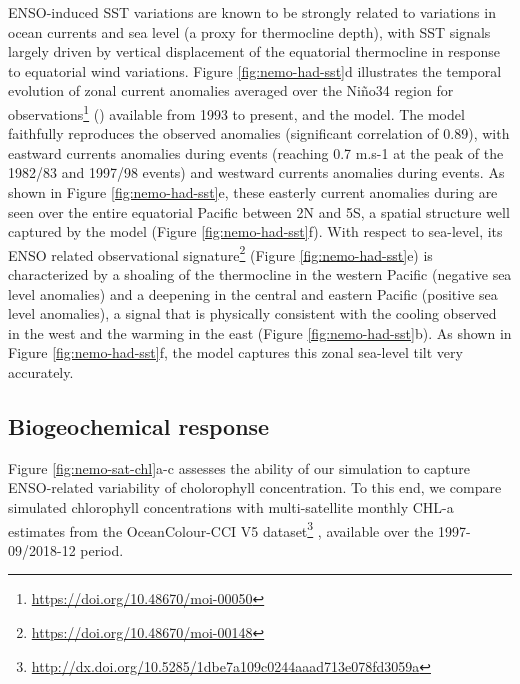 ENSO-induced SST variations are known to be strongly related to variations in ocean currents and sea level (a proxy for thermocline depth), with SST signals largely driven by vertical displacement of the equatorial thermocline in response to equatorial wind variations. Figure \ref{fig:nemo-had-sst}d illustrates the temporal evolution of zonal current anomalies averaged over the Niño34 region for observations\footnote{\url{https://doi.org/10.48670/moi-00050}} (\citealp{rioGOCEOceanCirculation2014}) available from 1993 to present, and the model. The model faithfully reproduces the observed anomalies (significant correlation of 0.89), with eastward currents anomalies during \nino{} events (reaching 0.7 m.s-1 at the peak of the 1982/83 and 1997/98 events) and westward currents anomalies during \nina{} events. As shown in Figure \ref{fig:nemo-had-sst}e, these easterly current anomalies during \nino{} are seen over the entire equatorial Pacific between 2N and 5S, a spatial structure well captured by the model (Figure \ref{fig:nemo-had-sst}f). With respect to sea-level, its ENSO related observational signature\footnote{\url{https://doi.org/10.48670/moi-00148}} (Figure \ref{fig:nemo-had-sst}e) is characterized by a shoaling of the thermocline in the western Pacific (negative sea level anomalies) and a deepening in the central and eastern Pacific (positive sea level anomalies), a signal that is physically consistent with the cooling observed in the west and the warming in the east (Figure \ref{fig:nemo-had-sst}b). As shown in Figure \ref{fig:nemo-had-sst}f, the model captures this zonal sea-level tilt very accurately.

\subsection{Biogeochemical response}

Figure \ref{fig:nemo-sat-chl}a-c assesses the ability of our simulation to capture ENSO-related variability of cholorophyll concentration. To this end, we compare simulated chlorophyll concentrations with multi-satellite monthly CHL-a estimates from the OceanColour-CCI V5  dataset\footnote{\url{http://dx.doi.org/10.5285/1dbe7a109c0244aaad713e078fd3059a}} \citep{sathyendranathOceanColourTimeSeries2019}, available over the 1997-09/2018-12 period. 


